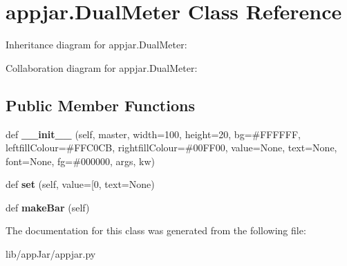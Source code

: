 \hypertarget{classappjar_1_1_dual_meter}{}\section{appjar.\+Dual\+Meter Class Reference}
\label{classappjar_1_1_dual_meter}


Inheritance diagram for appjar.\+Dual\+Meter\+:


Collaboration diagram for appjar.\+Dual\+Meter\+:
\subsection*{Public Member Functions}
\begin{DoxyCompactItemize}
\item 
\mbox{\label{classappjar_1_1_dual_meter_a1e843067d7b791718d091abc9f9837f7}} 
def {\bfseries \+\_\+\+\_\+init\+\_\+\+\_\+} (self, master, width=100, height=20, bg=\textquotesingle{}\#F\+F\+F\+F\+FF\textquotesingle{}, leftfill\+Colour=\textquotesingle{}\#F\+F\+C0\+CB\textquotesingle{}, rightfill\+Colour=\textquotesingle{}\#00\+F\+F00\textquotesingle{}, value=\+None, text=\+None, font=\+None, fg=\textquotesingle{}\#000000\textquotesingle{}, args, kw)
\item 
\mbox{\label{classappjar_1_1_dual_meter_aef1bc4398d2e35390469c41b7b4cb692}} 
def {\bfseries set} (self, value=\mbox{[}0, text=None)
\item 
\mbox{\label{classappjar_1_1_dual_meter_afa5eaa525a133e0faa71d3b286bc4ae7}} 
def {\bfseries make\+Bar} (self)
\end{DoxyCompactItemize}


The documentation for this class was generated from the following file\+:\begin{DoxyCompactItemize}
\item 
lib/app\+Jar/appjar.\+py\end{DoxyCompactItemize}
